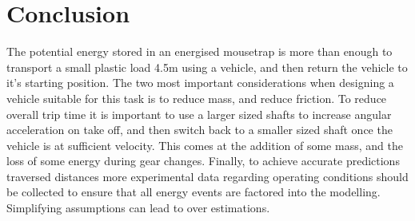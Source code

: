 \documentclass[a4paper]{article}
\begin{document}
\newpage

\section{Conclusion}
The potential energy stored in an energised mousetrap is more than enough to transport a small plastic load 4.5$\si{\meter}$ using a vehicle, and then return the vehicle to it's starting position. The two most important considerations when designing a vehicle suitable for this task is to reduce mass, and reduce friction. To reduce overall trip time it is important to use a larger sized shafts to increase angular acceleration on take off, and then switch back to a smaller sized shaft once the vehicle is at sufficient velocity. This comes at the addition of some mass, and the loss of some energy during gear changes. Finally, to achieve accurate predictions traversed distances more experimental data regarding operating conditions should be collected to ensure that all energy events are factored into the modelling. Simplifying assumptions can lead to over estimations. 



\end{document}
